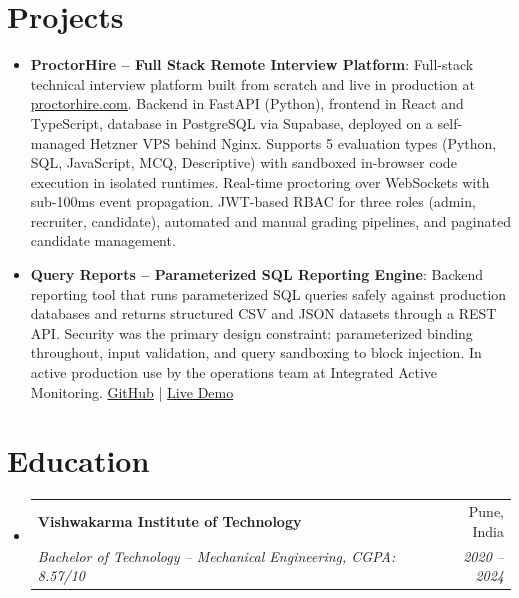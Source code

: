 \documentclass[letterpaper,11pt]{article}
\makeatletter
\newcommand{\resumeItem}[2]{
  \item\small{
    \textbf{#1}{: #2 \vspace{-2pt}}
  }
}
\newcommand{\resumeSubheading}[4]{
  \vspace{-1pt}\item
    \begin{tabular*}{0.97\textwidth}{l@{\extracolsep{\fill}}r}
      \textbf{#1} & #2 \\
      \textit{\small#3} & \textit{\small #4} \\
    \end{tabular*}\vspace{-5pt}
}
\newcommand{\resumeSubHeadingListStart}{\begin{itemize}[leftmargin=*]}
\newcommand{\resumeSubHeadingListEnd}{\end{itemize}}
\makeatother
\begin{document}
\section{Projects}
  \resumeSubHeadingListStart

    \resumeItem{ProctorHire -- Full Stack Remote Interview Platform}
      {Full-stack technical interview platform built from scratch and live in production at \href{https://proctorhire.com}{proctorhire.com}. Backend in FastAPI (Python), frontend in React and TypeScript, database in PostgreSQL via Supabase, deployed on a self-managed Hetzner VPS behind Nginx. Supports 5 evaluation types (Python, SQL, JavaScript, MCQ, Descriptive) with sandboxed in-browser code execution in isolated runtimes. Real-time proctoring over WebSockets with sub-100ms event propagation. JWT-based RBAC for three roles (admin, recruiter, candidate), automated and manual grading pipelines, and paginated candidate management.}

    \resumeItem{Query Reports -- Parameterized SQL Reporting Engine}
      {Backend reporting tool that runs parameterized SQL queries safely against production databases and returns structured CSV and JSON datasets through a REST API. Security was the primary design constraint: parameterized binding throughout, input validation, and query sandboxing to block injection. In active production use by the operations team at Integrated Active Monitoring. \href{https://github.com/AdityaYInamdar/query-reports}{GitHub} \; | \; \href{https://efsr.smart-iam.com/query-reports-demo}{Live Demo}}

  \resumeSubHeadingListEnd

\section{Education}
  \resumeSubHeadingListStart
    \resumeSubheading
      {Vishwakarma Institute of Technology}{Pune, India}
      {Bachelor of Technology -- Mechanical Engineering, CGPA: 8.57/10}{2020 -- 2024}
  \resumeSubHeadingListEnd
\end{document}
